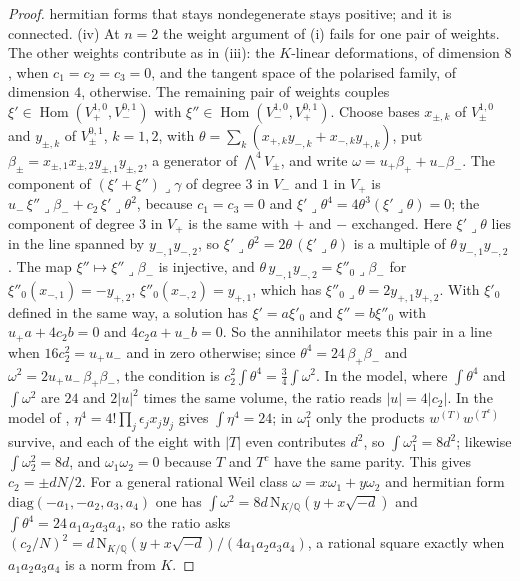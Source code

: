 \documentclass[11pt,reqno]{amsart}
\theoremstyle{plain}
\theoremstyle{definition}
\theoremstyle{remark}
\newcommand{\QQ}{\mathbb{Q}}
\newcommand{\Nm}{\mathrm{N}}             %
\DeclareMathOperator{\Hom}{Hom}
\begin{document}
\begin{proof}
hermitian forms that stays nondegenerate stays positive; and it is
connected. (iv) At $n=2$ the weight argument of
(i) fails for one pair of weights. The other weights
contribute as in (iii): the $K$-linear deformations, of dimension $8$, when
$c_{1}=c_{2}=c_{3}=0$, and the tangent space of the polarised family, of
dimension $4$, otherwise. The remaining pair of weights couples
$\xi'\in\Hom(V_{+}^{1,0},V_{-}^{0,1})$ with
$\xi''\in\Hom(V_{-}^{1,0},V_{+}^{0,1})$. Choose bases $x_{\pm,k}$ of
$V_{\pm}^{1,0}$ and $y_{\pm,k}$ of $V_{\pm}^{0,1}$, $k=1,2$, with
$\theta=\sum_{k}(x_{+,k}y_{-,k}+x_{-,k}y_{+,k})$, put
$\beta_{\pm}=x_{\pm,1}x_{\pm,2}y_{\pm,1}y_{\pm,2}$, a generator of
$\bigwedge^{4}V_{\pm}$, and write $\omega=u_{+}\beta_{+}+u_{-}\beta_{-}$. The component of
$(\xi'+\xi'')\lrcorner\gamma$ of degree $3$ in $V_{-}$ and $1$ in $V_{+}$ is
$u_{-}\,\xi''\lrcorner\beta_{-}+c_{2}\,\xi'\lrcorner\theta^{2}$, because
$c_{1}=c_{3}=0$ and $\xi'\lrcorner\theta^{4}=4\theta^{3}(\xi'\lrcorner\theta)=0$;
the component of degree $3$ in $V_{+}$ is the same with $+$ and $-$
exchanged.
Here $\xi'\lrcorner\theta$ lies in the line spanned by $y_{-,1}y_{-,2}$, so
$\xi'\lrcorner\theta^{2}=2\theta\,(\xi'\lrcorner\theta)$ is a multiple of
$\theta\,y_{-,1}y_{-,2}$. The map $\xi''\mapsto\xi''\lrcorner\beta_{-}$ is
injective, and $\theta\,y_{-,1}y_{-,2}=\xi''_{0}\lrcorner\beta_{-}$ for
$\xi''_{0}(x_{-,1})=-y_{+,2}$, $\xi''_{0}(x_{-,2})=y_{+,1}$, which has
$\xi''_{0}\lrcorner\theta=2y_{+,1}y_{+,2}$. With $\xi'_{0}$ defined in the
same way, a solution has $\xi'=a\xi'_{0}$ and $\xi''=b\xi''_{0}$ with
$u_{+}a+4c_{2}b=0$ and $4c_{2}a+u_{-}b=0$. So the annihilator meets this
pair in a line when $16c_{2}^{2}=u_{+}u_{-}$ and in zero otherwise; since
$\theta^{4}=24\,\beta_{+}\beta_{-}$ and
$\omega^{2}=2u_{+}u_{-}\,\beta_{+}\beta_{-}$, the condition is
$c_{2}^{2}\int\theta^{4}=\frac34\int\omega^{2}$.
In the model, where $\int\theta^{4}$ and $\int\omega^{2}$ are $24$ and
$2|u|^{2}$ times the same volume, the ratio reads $|u|=4|c_{2}|$. In the
model of \cite[Setup~4.1]{paperI}, $\eta^{4}=4!\prod_{j}\epsilon_{j}x_{j}y_{j}$
gives $\int\eta^{4}=24$; in $\omega_{1}^{2}$ only the products
$w^{(T)}w^{(T^{c})}$ survive, and each of the eight with $|T|$ even contributes
$d^{2}$, so $\int\omega_{1}^{2}=8d^{2}$; likewise $\int\omega_{2}^{2}=8d$, and
$\omega_{1}\omega_{2}=0$ because $T$ and $T^{c}$ have the same parity. This
gives $c_{2}=\pm dN/2$. For a general rational
Weil class $\omega=x\omega_{1}+y\omega_{2}$ and hermitian form
$\mathrm{diag}(-a_{1},-a_{2},a_{3},a_{4})$ one has
$\int\omega^{2}=8d\,\Nm_{K/\QQ}(y+x\sqrt{-d})$ and
$\int\theta^{4}=24\,a_{1}a_{2}a_{3}a_{4}$, so the ratio asks
$(c_{2}/N)^{2}=d\,\Nm_{K/\QQ}(y+x\sqrt{-d})/(4a_{1}a_{2}a_{3}a_{4})$, a rational
square exactly when $a_{1}a_{2}a_{3}a_{4}$ is a norm from $K$.
\end{proof}
\end{document}
